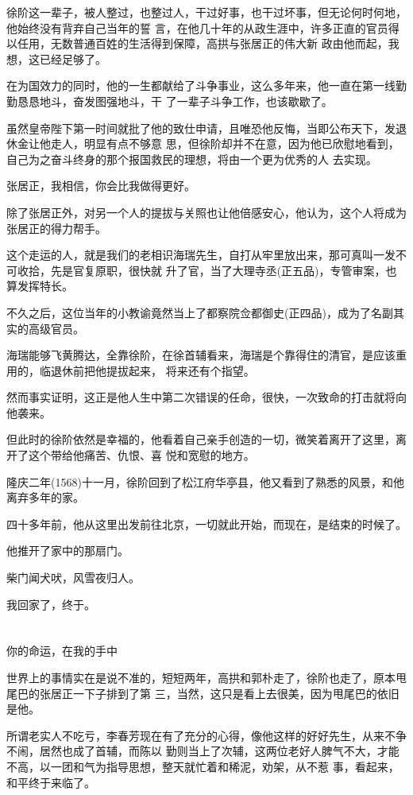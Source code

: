 \documentclass[11pt,a4paper,onecolumn]{article}
\begin{document}
徐阶这一辈子，被人整过，也整过人，干过好事，也干过坏事，但无论何时何地，他始终没有背弃自己当年的誓
言，在他几十年的从政生涯中，许多正直的官员得以任用，无数普通百姓的生活得到保障，高拱与张居正的伟大新
政由他而起，我想，这已经足够了。

在为国效力的同时，他的一生都献给了斗争事业，这么多年来，他一直在第一线勤勤恳恳地斗，奋发图强地斗，干
了一辈子斗争工作，也该歇歇了。

虽然皇帝陛下第一时间就批了他的致仕申请，且唯恐他反悔，当即公布天下，发退休金让他走人，明显有点不够意
思，但徐阶却并不在意，因为他已欣慰地看到，自己为之奋斗终身的那个报国救民的理想，将由一个更为优秀的人
去实现。

张居正，我相信，你会比我做得更好。

除了张居正外，对另一个人的提拔与关照也让他倍感安心，他认为，这个人将成为张居正的得力帮手。

这个走运的人，就是我们的老相识海瑞先生，自打从牢里放出来，那可真叫一发不可收拾，先是官复原职，很快就
升了官，当了大理寺丞(正五品)，专管审案，也算发挥特长。

不久之后，这位当年的小教谕竟然当上了都察院佥都御史(正四品)，成为了名副其实的高级官员。

海瑞能够飞黄腾达，全靠徐阶，在徐首辅看来，海瑞是个靠得住的清官，是应该重用的，临退休前把他提拔起来，
将来还有个指望。

然而事实证明，这正是他人生中第二次错误的任命，很快，一次致命的打击就将向他袭来。

但此时的徐阶依然是幸福的，他看着自己亲手创造的一切，微笑着离开了这里，离开了这个带给他痛苦、仇恨、喜
悦和宽慰的地方。

隆庆二年(1568)十一月，徐阶回到了松江府华亭县，他又看到了熟悉的风景，和他离弃多年的家。

四十多年前，他从这里出发前往北京，一切就此开始，而现在，是结束的时候了。

他推开了家中的那扇门。

柴门闻犬吠，风雪夜归人。

我回家了，终于。

\section[\thesection]{}

你的命运，在我的手中

世界上的事情实在是说不准的，短短两年，高拱和郭朴走了，徐阶也走了，原本甩尾巴的张居正一下子排到了第
三，当然，这只是看上去很美，因为甩尾巴的依旧是他。

所谓老实人不吃亏，李春芳现在有了充分的心得，像他这样的好好先生，从来不争不闹，居然也成了首辅，而陈以
勤则当上了次辅，这两位老好人脾气不大，才能不高，以一团和气为指导思想，整天就忙着和稀泥，劝架，从不惹
事，看起来，和平终于来临了。
\end{document}
